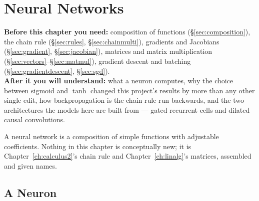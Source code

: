 \chapter{Neural Networks}
\label{ch:neuralnets}

\begin{tcolorbox}[feynbox={Sky}{BBg},title={Before and After}]
\textbf{Before this chapter you need:} composition of functions
(\S\ref{sec:composition}), the chain rule
(\S\ref{sec:rules}, \S\ref{sec:chainmulti}), gradients and Jacobians
(\S\ref{sec:gradient}, \S\ref{sec:jacobian}), matrices and matrix
multiplication (\S\ref{sec:vectors}--\S\ref{sec:matmul}), gradient descent and
batching (\S\ref{sec:gradientdescent}, \S\ref{sec:sgd}).\\
\textbf{After it you will understand:} what a neuron computes, why the choice
between sigmoid and $\tanh$ changed this project's results by more than any other
single edit, how backpropagation is the chain rule run backwards, and the two
architectures the models here are built from --- gated recurrent cells and dilated
causal convolutions.
\end{tcolorbox}

A neural network is a composition of simple functions with adjustable
coefficients. Nothing in this chapter is conceptually new; it is
Chapter~\ref{ch:calculus2}'s chain rule and Chapter~\ref{ch:linalg}'s matrices,
assembled and given names.

\section{A Neuron}
\label{sec:neuron}



